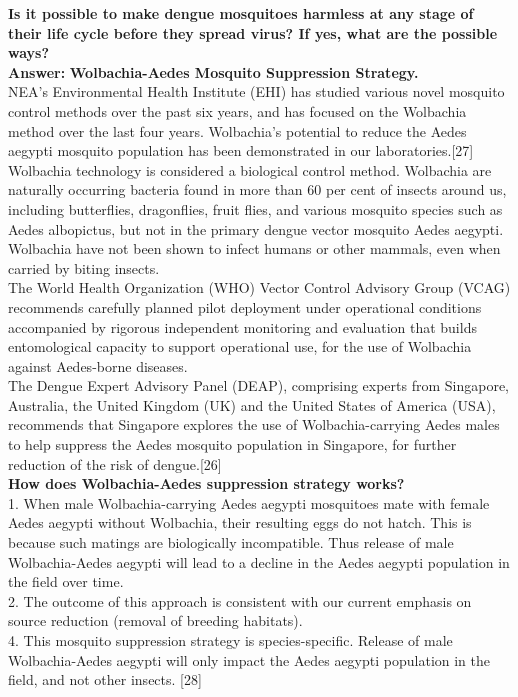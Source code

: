 \documentclass[11pt]{exam}
\begin{document}
\begin{questions}

\question
\label{12. Dengue: Incapaciating Ae.Agypti }
\textbf{Is it possible to make dengue mosquitoes harmless at any stage of their life cycle before they spread virus? If yes, what are the possible ways?}\\
\textbf{Answer:}  \textbf{Wolbachia-Aedes Mosquito Suppression Strategy.}\\

NEA’s Environmental Health Institute (EHI) has studied various novel mosquito control methods over the past six years, and has focused on the Wolbachia method over the last four years. Wolbachia’s potential to reduce the Aedes aegypti mosquito population has been demonstrated in our laboratories.[27]\\ 

Wolbachia technology is considered a biological control method. Wolbachia are naturally occurring bacteria found in more than 60 per cent of insects around us, including butterflies, dragonflies, fruit flies, and various mosquito species such as Aedes albopictus, but not in the primary dengue vector mosquito Aedes aegypti. Wolbachia have not been shown to infect humans or other mammals, even when carried by biting insects.\\

The World Health Organization (WHO) Vector Control Advisory Group (VCAG) recommends carefully planned pilot deployment under operational conditions accompanied by rigorous independent monitoring and evaluation that builds entomological capacity to support operational use, for the use of Wolbachia against Aedes-borne diseases.\\

The Dengue Expert Advisory Panel (DEAP), comprising experts from Singapore, Australia, the United Kingdom (UK) and the United States of America (USA), recommends that Singapore explores the use of Wolbachia-carrying Aedes males to help suppress the Aedes mosquito population in Singapore, for further reduction of the risk of dengue.[26]\\

\textbf{How does Wolbachia-Aedes suppression strategy works?}\\
1. When male Wolbachia-carrying Aedes aegypti mosquitoes mate with female Aedes aegypti without Wolbachia, their resulting eggs do not hatch. This is because such matings are biologically incompatible. Thus release of male Wolbachia-Aedes aegypti will lead to a decline in the Aedes aegypti population in the field over time.\\
2. The outcome of this approach is consistent with our current emphasis on source reduction (removal of breeding habitats).\\
4. This mosquito suppression strategy is species-specific. Release of male Wolbachia-Aedes aegypti will only impact the Aedes aegypti population in the field, and not other insects.
[28]\\


\end{questions}
\end{document}

